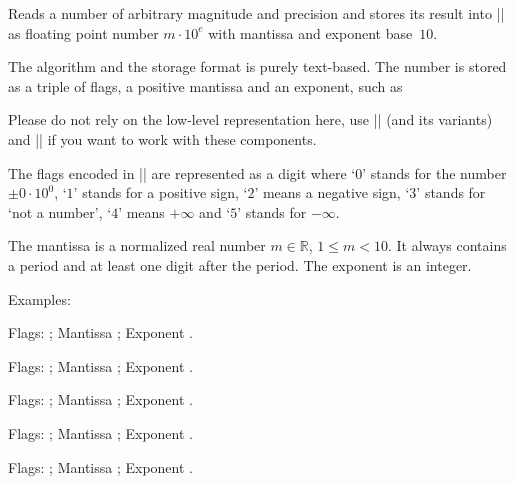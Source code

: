 \begin{command}{\pgfmathfloatparsenumber{}}
    Reads a number of arbitrary magnitude and precision and stores its result
    into |\pgfmathresult| as floating point number $m \cdot 10^e$ with mantissa
    and exponent base~$10$.

    The algorithm and the storage format is purely text-based. The number is
    stored as a triple of flags, a positive mantissa and an exponent, such as
\begin{codeexample}[]
\pgfmathresult
\end{codeexample}
    Please do not rely on the low-level representation here, use
    |\pgfmathfloattomacro| (and its variants) and |\pgfmathfloatcreate| if you
    want to work with these components.

    The flags encoded in |\pgfmathresult| are represented as a digit where
    `$0$' stands for the number $\pm 0\cdot 10^0$, `$1$' stands for a positive
    sign, `$2$' means a negative sign, `$3$' stands for `not a number', `$4$'
    means $+\infty$ and `$5$' stands for $-\infty$.

    The mantissa is a normalized real number $m \in \mathbb{R}$, $1 \le m <
    10$. It always contains a period and at least one digit after the period.
    The exponent is an integer.

    Examples:
\begin{codeexample}[]
\pgfmathfloattomacro{\pgfmathresult}{\F}{\M}{\E}
Flags: \F; Mantissa \M; Exponent \E.
\end{codeexample}

\begin{codeexample}[]
\pgfmathfloattomacro{\pgfmathresult}{\F}{\M}{\E}
Flags: \F; Mantissa \M; Exponent \E.
\end{codeexample}

\begin{codeexample}[]
\pgfmathfloattomacro{\pgfmathresult}{\F}{\M}{\E}
Flags: \F; Mantissa \M; Exponent \E.
\end{codeexample}

\begin{codeexample}[]
\pgfmathfloattomacro{\pgfmathresult}{\F}{\M}{\E}
Flags: \F; Mantissa \M; Exponent \E.
\end{codeexample}

\begin{codeexample}[]
\pgfmathfloattomacro{\pgfmathresult}{\F}{\M}{\E}
Flags: \F; Mantissa \M; Exponent \E.
\end{codeexample}


\end{command}
